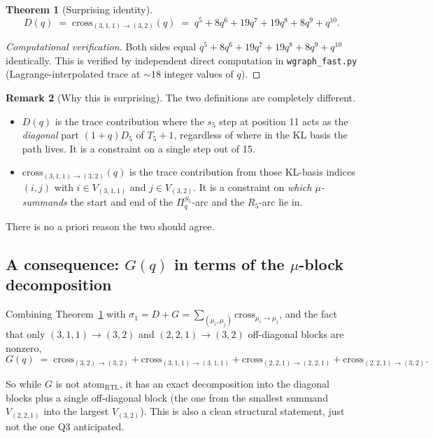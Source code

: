 \documentclass[11pt]{article}
\newtheorem{theorem}{Theorem}
\theoremstyle{definition}
\newtheorem{remark}[theorem]{Remark}
\begin{document}
\begin{theorem}[Surprising identity]\label{thm:surprise}
\[
D(q) \;=\; \mathrm{cross}_{(3,1,1)\to(3,2)}(q) \;=\; q^5 + 8q^6 + 19q^7 + 19q^8 + 8q^9 + q^{10}.
\]
\end{theorem}

\begin{proof}[Computational verification]
Both sides equal $q^5 + 8q^6 + 19q^7 + 19q^8 + 8q^9 + q^{10}$ identically. This is verified by independent direct computation in \texttt{wgraph\_fast.py} (Lagrange-interpolated trace at $\sim 18$ integer values of $q$). \qedhere
\end{proof}

\begin{remark}[Why this is surprising]\label{rem:surprise}
The two definitions are completely different.
\begin{itemize}[leftmargin=2em,topsep=0.2em,itemsep=0.1em]
\item $D(q)$ is the trace contribution where the $s_5$ step at position 11 acts as the \emph{diagonal} part $(1+q)D_5$ of $T_5+1$, regardless of where in the KL basis the path lives. It is a constraint on a single step out of 15.
\item $\mathrm{cross}_{(3,1,1)\to(3,2)}(q)$ is the trace contribution from those KL-basis indices $(i,j)$ with $i \in V_{(3,1,1)}$ and $j \in V_{(3,2)}$. It is a constraint on \emph{which $\mu$-summands} the start and end of the $\Pi_q^{S_5}$-arc and the $R_5$-arc lie in.
\end{itemize}
There is no a priori reason the two should agree.
\end{remark}

\subsection*{A consequence: $G(q)$ in terms of the $\mu$-block decomposition}

Combining Theorem~\ref{thm:surprise} with $\sigma_1 = D + G = \sum_{(\mu_i, \mu_j)} \mathrm{cross}_{\mu_i \to \mu_j}$, and the fact that only $(3,1,1)\to(3,2)$ and $(2,2,1)\to(3,2)$ off-diagonal blocks are nonzero,
\[
G(q) \;=\; \mathrm{cross}_{(3,2)\to(3,2)} + \mathrm{cross}_{(3,1,1)\to(3,1,1)} + \mathrm{cross}_{(2,2,1)\to(2,2,1)} + \mathrm{cross}_{(2,2,1)\to(3,2)}.
\]

So while $G$ is not $\mathrm{atom}_{\mathrm{RTL}}$, it has an exact decomposition into the diagonal blocks plus a single off-diagonal block (the one from the smallest summand $V_{(2,2,1)}$ into the largest $V_{(3,2)}$). This is also a clean structural statement, just not the one Q3 anticipated.
\end{document}
